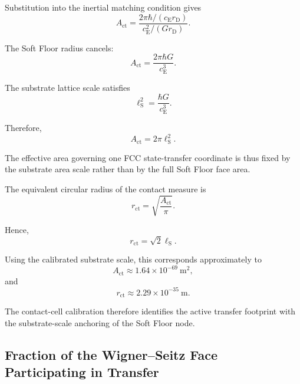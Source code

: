 Substitution into the inertial matching condition gives
\begin{equation}
    A_{\mathrm{ct}} = \frac{ 2\pi\hbar/(c_{\mathrm{E}}r_{\mathrm{D}}) }{ c_{\mathrm{E}}^2/(Gr_{\mathrm{D}}) }.
\end{equation}

The Soft Floor radius cancels:
\begin{equation}
    A_{\mathrm{ct}} = \frac{ 2\pi\hbar G }{ c_{\mathrm{E}}^3 }.
\end{equation}

The substrate lattice scale satisfies
\begin{equation}
    \ell_{\mathrm{S}}^2 = \frac{\hbar G}{c_{\mathrm{E}}^3}.
\end{equation}

Therefore,
\begin{equation}
    \boxed{ A_{\mathrm{ct}} = 2\pi\ell_{\mathrm{S}}^2 }.
\end{equation}

The effective area governing one FCC state-transfer coordinate is thus fixed by the substrate area scale rather than by the full Soft Floor face area.

The equivalent circular radius of the contact measure is
\begin{equation}
    r_{\mathrm{ct}} = \sqrt{ \frac{A_{\mathrm{ct}}}{\pi} }.
\end{equation}

Hence,
\begin{equation}
    \boxed{ r_{\mathrm{ct}} = \sqrt{2}\ell_{\mathrm{S}} }.
\end{equation}

Using the calibrated substrate scale, this corresponds approximately to
\begin{equation}
    A_{\mathrm{ct}} \approx 1.64\times 10^{-69} \ \mathrm{m}^2,
\end{equation}
and
\begin{equation}
    r_{\mathrm{ct}} \approx 2.29\times 10^{-35} \ \mathrm{m}.
\end{equation}

The contact-cell calibration therefore identifies the active transfer footprint with the substrate-scale anchoring of the Soft Floor node.

\subsection{Fraction of the Wigner--Seitz Face Participating in Transfer}

